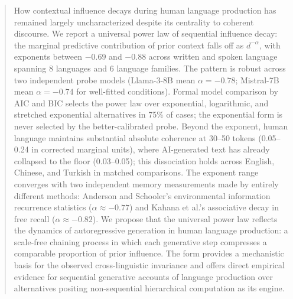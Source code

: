 \documentclass[9pt,twocolumn,twoside]{pnas-new}
\begin{document}
\begin{abstract}
How contextual influence decays during human language production has remained largely uncharacterized despite its centrality to coherent discourse. We report a universal power law of sequential influence decay: the marginal predictive contribution of prior context falls off as $d^{-\alpha}$, with exponents between $-0.69$ and $-0.88$ across written and spoken language spanning 8 languages and 6 language families. The pattern is robust across two independent probe models (Llama-3-8B mean $\alpha = -0.78$; Mistral-7B mean $\alpha = -0.74$ for well-fitted conditions). Formal model comparison by AIC and BIC selects the power law over exponential, logarithmic, and stretched exponential alternatives in 75\% of cases; the exponential form is never selected by the better-calibrated probe. Beyond the exponent, human language maintains substantial absolute coherence at 30--50 tokens (0.05--0.24 in corrected marginal units), where AI-generated text has already collapsed to the floor (0.03--0.05); this dissociation holds across English, Chinese, and Turkish in matched comparisons. The exponent range converges with two independent memory measurements made by entirely different methods: Anderson and Schooler's environmental information recurrence statistics ($\alpha \approx -0.77$) and Kahana et al.'s associative decay in free recall ($\alpha \approx -0.82$). We propose that the universal power law reflects the dynamics of autoregressive generation in human language production: a scale-free chaining process in which each generative step compresses a comparable proportion of prior influence. The form provides a mechanistic basis for the observed cross-linguistic invariance and offers direct empirical evidence for sequential generative accounts of language production over alternatives positing non-sequential hierarchical computation as its engine.
\end{abstract}


\maketitle
\thispagestyle{firststyle}

\Firstpage
\end{document}
